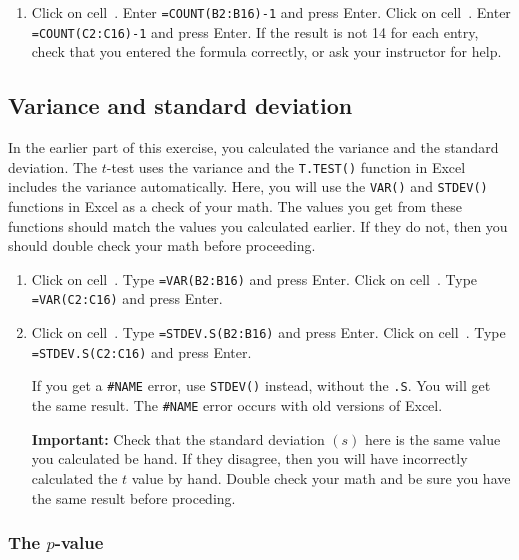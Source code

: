 \documentclass[12pt]{exam}
\newcommand*\xcell[1]{cell~\liningnum{#1}}
\begin{document}
\begin{enumerate}[resume]

	\item \label{df_calc} Click on \xcell{B18}. Enter \texttt{=COUNT(B2:B16)-1} and press Enter. Click on \xcell{C18}. Enter \texttt{=COUNT(C2:C16)-1} and press Enter. If the result is not 14 for each entry, check that you entered the formula correctly, or ask your instructor for help.
	
\end{enumerate}

\subsection*{Variance and standard deviation}

In the earlier part of this exercise, you calculated the variance and the standard deviation. The $t$-test uses the variance and the \texttt{T.TEST()} function in Excel includes the variance automatically. Here, you will use the \texttt{VAR()} and \texttt{STDEV()} functions in Excel as a check of your math. The values you get from these functions should match the values you calculated earlier.  If they do not, then you should double check your math before proceeding.

\begin{enumerate}[resume]

	\item Click on \xcell{B19}. Type \texttt{=VAR(B2:B16)} and press Enter. Click on \xcell{C19}. Type \texttt{=VAR(C2:C16)} and press Enter. 

	\item Click on \xcell{B20}. Type \texttt{=STDEV.S(B2:B16)} and press Enter. Click on \xcell{C20}. Type \texttt{=STDEV.S(C2:C16)} and press Enter. 
	
		If you get a \texttt{\#NAME} error, use \texttt{STDEV()} instead, without the \texttt{.S}. You will get the same result. The \texttt{\#NAME} error occurs with old versions of Excel.  
		
		\textbf{Important:} Check that the standard deviation $\left(s\right)$ here is the same value you calculated be hand. If they disagree, then you will have incorrectly calculated the $t$ value by hand. Double check your math and be sure you have the same result before proceding.
	
\end{enumerate}

\subsubsection*{The $p$-value}
\end{document}
